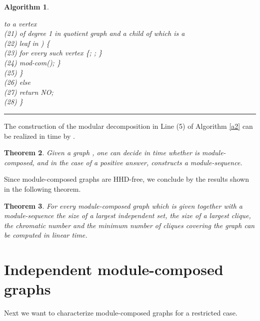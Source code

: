 \documentclass[11pt]{article}
\newtheorem{theorem}{Theorem}[section]
\newtheorem{alg}[theorem]{Algorithm}
\begin{document}
\begin{alg}
\begin{tabbing}
to a vertex  \\
(21)  \> \> \> \> of degree 1 in quotient graph  and a child  of  which is a \\
(22)  \> \> \> \> leaf in ) \{  \\
(23)  \> \> \> \> \>for every such vertex   \{; ; \}\\
(24)  \> \> \> \> \>mod-com(); \} \\ 
(25)  \> \> \> \} \\
(26)  \> \> \> else\\
(27)  \> \> \> \> return NO;\\
(28)  \> \> \} \\
\end{tabbing}

\vspace{-0.5cm}
\hrule
\end{alg}





The construction of the modular decomposition  in Line (5) of Algorithm \ref{a2} 
can be realized in time  by \cite{CH94,MS99}. 


\begin{theorem}
Given a graph , one can decide in time  whether
 is module-composed, and in the case of a positive answer, constructs  a module-sequence.
\end{theorem}






Since module-composed graphs are HHD-free, we conclude by the results shown in
\cite{JO88} the following theorem.

\begin{theorem}
For every module-composed graph which is given together with a module-sequence the size of a largest independent set, the size of a largest clique, 
the chromatic number and the minimum number of cliques covering the graph
can be computed in linear time.
\end{theorem}






\section{Independent module-composed graphs}



Next we want to characterize module-composed graphs for a restricted case.
\end{document}
